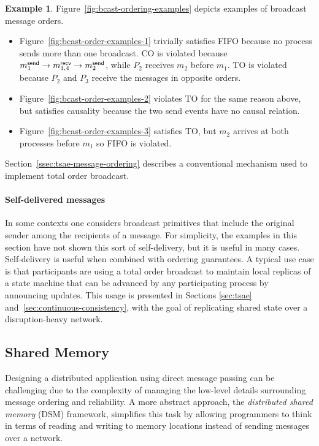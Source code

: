 \documentclass[]             %
{NASA}                       %
\theoremstyle{definition}
\newtheorem{example}[theorem]{Example}
\providecommand{\tightlist}{%
  \setlength{\itemsep}{0pt}\setlength{\parskip}{0pt}}
\begin{document}
\begin{example}
Figure~\ref{fig:bcast-ordering-examples} depicts examples of broadcast
message orders.
\begin{itemize}
  \tightlist
\item Figure~\ref{fig:bcast-order-examples-1} trivially satisfies FIFO
  because no process sends more than one broadcast. CO is violated
  because $m_{1}^{\mathsf{send}} \to m_{1,4}^{\mathsf{recv}} \to m_{2}^{\mathsf{send}}$, while $P_2$
  receives $m_2$ before $m_1$. TO is violated because $P_2$ and $P_3$
  receive the messages in opposite orders.
\item Figure~\ref{fig:bcast-order-examples-2} violates TO for the same
  reason above, but satisfies causality because the two send events
  have no causal relation.
\item Figure~\ref{fig:bcast-order-examples-3}
  satisfies TO, but $m_2$ arrives at both processes before $m_1$ so
  FIFO is violated.
\end{itemize}
\end{example}
Section~\ref{ssec:tsae-message-ordering} describes a conventional
mechanism used to implement total order broadcast.
\paragraph{Self-delivered messages}
In some contexts one considers broadcast primitives that include the
original sender among the recipients of a message. For simplicity, the
examples in this section have not shown this sort of self-delivery,
but it is useful in many cases. Self-delivery is useful when combined
with ordering guarantees. A typical use case is that participants are
using a total order broadcast to maintain local replicas of a state
machine that can be advanced by any participating process by
announcing updates.  This usage is presented in Sections
\ref{sec:tsae} and~\ref{sec:continuous-consistency}, with the goal of
replicating shared state over a disruption-heavy network.

\subsection{Shared Memory}
\label{ssec:shared-memory}
Designing a distributed application using direct message passing can be
challenging due to the complexity of managing the low-level details
surrounding message ordering and reliability. A more abstract
approach, the \emph{distributed shared memory} (DSM) framework,
simplifies this task by allowing programmers to think in terms of
reading and writing to memory locations instead of sending messages
over a network.
\end{document}
